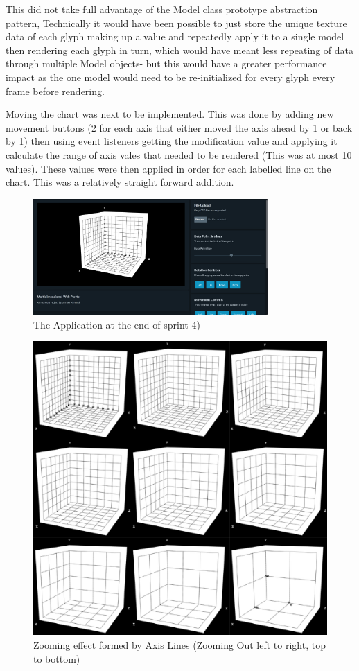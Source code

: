 This did not take full advantage of the Model class prototype abstraction pattern, Technically it would have been possible to just store the unique texture data of each glyph making up a value and repeatedly apply it to a single model then rendering each glyph in turn, which would have meant less repeating of data through multiple Model objects- but this would have a greater performance impact as the one model would need to be re-initialized for every glyph every frame before rendering.

Moving the chart was next to be implemented. This was done by adding new movement buttons (2 for each axis that either moved the axis ahead by 1 or back by 1) then using event listeners getting the modification value and applying it calculate the range of axis vales that needed to be rendered (This was at most 10 values). These values were then applied in order for each labelled line on the chart. This was a relatively straight forward addition.

\begin{figure}[h]
    \centering
    \includegraphics[width=0.8\textwidth]{author-files/figures/pretestScreenshot.png}
    \caption{The Application at the end of sprint 4)}
    \label{fig:oldzoom}
\end{figure}

\begin{figure}[h]
    \centering
    \includegraphics[width=0.8\columnwidth]{author-files/figures/oldzooms.png}
    \caption{Zooming effect formed by Axis Lines (Zooming Out left to right, top to bottom)}
    \label{fig:oldzoom}
\end{figure}

